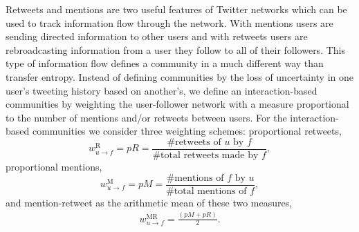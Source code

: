 Retweets and mentions are two useful features of Twitter networks which can be used to track information flow through the network.
With mentions users are sending directed information to other users and with retweets users are rebroadcasting information from a user they follow to all of their followers. 
This type of information flow defines a community in a much different way than transfer entropy. Instead of defining communities by the loss of uncertainty in one user's tweeting history based on another's, we define an interaction-based communities by weighting the user-follower network with a measure proportional to the number of mentions and/or retweets between users. 
For the interaction-based communities we consider three weighting schemes: proportional retweets,
\begin{equation}
w_{u \to f}^{\text{R}}=pR=\frac{\mbox{\# retweets of }u \mbox{ by }f}{\mbox{\# total retweets made by }f},
\end{equation}
proportional mentions,
\begin{equation}
w_{u \to f}^{\text{M}} = pM = \frac{\mbox{\# mentions of }f \mbox{ by }u}{\mbox{\# total mentions of }f},
\end{equation}
and mention-retweet as the arithmetic mean of these two measures,
\begin{align}
\label{Eqn-EW-interaction}
	w_{u \to f}^{\text{MR}} = \frac{(pM+pR)}{2}.
\end{align} 


